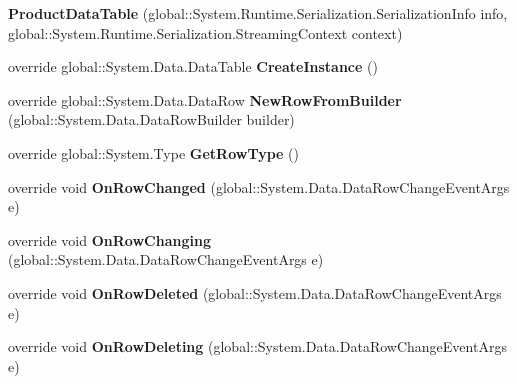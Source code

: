 \begin{DoxyCompactItemize}
\item 
{\bfseries Product\+Data\+Table} (global\+::\+System.\+Runtime.\+Serialization.\+Serialization\+Info info, global\+::\+System.\+Runtime.\+Serialization.\+Streaming\+Context context)\hypertarget{class_products_1_1_data_1_1ds_sage_1_1_product_data_table_a3a0049bae2f5701ad97e32db605a2ee6}{}\label{class_products_1_1_data_1_1ds_sage_1_1_product_data_table_a3a0049bae2f5701ad97e32db605a2ee6}

\item 
override global\+::\+System.\+Data.\+Data\+Table {\bfseries Create\+Instance} ()\hypertarget{class_products_1_1_data_1_1ds_sage_1_1_product_data_table_a023265584cc7be347d10c3a89990b1f2}{}\label{class_products_1_1_data_1_1ds_sage_1_1_product_data_table_a023265584cc7be347d10c3a89990b1f2}

\item 
override global\+::\+System.\+Data.\+Data\+Row {\bfseries New\+Row\+From\+Builder} (global\+::\+System.\+Data.\+Data\+Row\+Builder builder)\hypertarget{class_products_1_1_data_1_1ds_sage_1_1_product_data_table_a6baf75f4a3bafc76729450c91f2dd685}{}\label{class_products_1_1_data_1_1ds_sage_1_1_product_data_table_a6baf75f4a3bafc76729450c91f2dd685}

\item 
override global\+::\+System.\+Type {\bfseries Get\+Row\+Type} ()\hypertarget{class_products_1_1_data_1_1ds_sage_1_1_product_data_table_a9a930d3686e6e505f11b9086c9972d4c}{}\label{class_products_1_1_data_1_1ds_sage_1_1_product_data_table_a9a930d3686e6e505f11b9086c9972d4c}

\item 
override void {\bfseries On\+Row\+Changed} (global\+::\+System.\+Data.\+Data\+Row\+Change\+Event\+Args e)\hypertarget{class_products_1_1_data_1_1ds_sage_1_1_product_data_table_ac7d515129183a5d84b748cee041d6482}{}\label{class_products_1_1_data_1_1ds_sage_1_1_product_data_table_ac7d515129183a5d84b748cee041d6482}

\item 
override void {\bfseries On\+Row\+Changing} (global\+::\+System.\+Data.\+Data\+Row\+Change\+Event\+Args e)\hypertarget{class_products_1_1_data_1_1ds_sage_1_1_product_data_table_a5b6f8080770963866cc73d3e98818326}{}\label{class_products_1_1_data_1_1ds_sage_1_1_product_data_table_a5b6f8080770963866cc73d3e98818326}

\item 
override void {\bfseries On\+Row\+Deleted} (global\+::\+System.\+Data.\+Data\+Row\+Change\+Event\+Args e)\hypertarget{class_products_1_1_data_1_1ds_sage_1_1_product_data_table_a04d6915f95c41d7128f6919216ee7fa8}{}\label{class_products_1_1_data_1_1ds_sage_1_1_product_data_table_a04d6915f95c41d7128f6919216ee7fa8}

\item 
override void {\bfseries On\+Row\+Deleting} (global\+::\+System.\+Data.\+Data\+Row\+Change\+Event\+Args e)\hypertarget{class_products_1_1_data_1_1ds_sage_1_1_product_data_table_a3410be15b52e169fdd5cbc325dafc77f}{}\label{class_products_1_1_data_1_1ds_sage_1_1_product_data_table_a3410be15b52e169fdd5cbc325dafc77f}

\end{DoxyCompactItemize}
